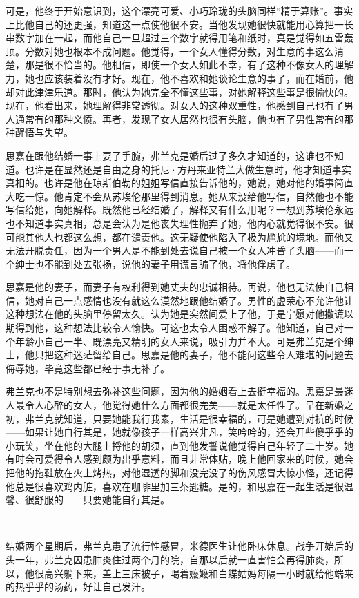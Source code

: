 \par 可是，他终于开始意识到，这个漂亮可爱、小巧玲珑的头脑同样“精于算账”。事实上比他自己的还更强，知道这一点使他很不安。当他发现她很快就能用心算把一长串数字加在一起，而他自己一旦超过三个数字就得用笔和纸时，真是觉得如五雷轰顶。分数对她也根本不成问题。他觉得，一个女人懂得分数，对生意的事这么清楚，那是很不恰当的。他相信，即使一个女人如此不幸，有了这种不像女人的理解力，她也应该装着没有才好。现在，他不喜欢和她谈论生意的事了，而在婚前，他却对此津津乐道。那时，他认为她完全不懂这些事，对她解释这些事是很愉快的。现在，他看出来，她理解得非常透彻。对女人的这种双重性，他感到自己也有了男人通常有的那种义愤。再者，发现了女人居然也很有头脑，他也有了男性常有的那种醒悟与失望。
\par 思嘉在跟他结婚一事上耍了手腕，弗兰克是婚后过了多久才知道的，这谁也不知道。也许是在显然还是自由之身的托尼·方丹来亚特兰大做生意时，他才知道事实真相的。也许是他在琼斯伯勒的姐姐写信直接告诉他的，她说，她对他的婚事简直大吃一惊。他肯定不会从苏埃伦那里得到消息。她从来没给他写信，自然他也不能写信给她，向她解释。既然他已经结婚了，解释又有什么用呢？一想到苏埃伦永远也不知道事实真相，总是会认为是他丧失理性抛弃了她，他内心就觉得很不安。很可能其他人也都这么想，都在谴责他。这无疑使他陷入了极为尴尬的境地。而他又无法开脱责任，因为一个男人是不能到处去说自己被一个女人冲昏了头脑——而一个绅士也不能到处去张扬，说他的妻子用谎言骗了他，将他俘虏了。
\par 思嘉是他的妻子，而妻子有权利得到她丈夫的忠诚相待。再说，他也无法使自己相信，她对自己一点感情也没有就这么漠然地跟他结婚了。男性的虚荣心不允许他让这种想法在他的头脑里停留太久。认为她是突然间爱上了他，于是宁愿对他撒谎以期得到他，这种想法比较令人愉快。可这也太令人困惑不解了。他知道，自己对一个年龄小自己一半、既漂亮又精明的女人来说，吸引力并不大。可是弗兰克是个绅士，他只把这种迷茫留给自己。思嘉是他的妻子，他不能问这些令人难堪的问题去侮辱她，毕竟这些都已经于事无补了。
\par 弗兰克也不是特别想去弥补这些问题，因为他的婚姻看上去挺幸福的。思嘉是最迷人最令人心醉的女人，他觉得她什么方面都很完美——就是太任性了。早在新婚之初，弗兰克就知道，只要她能我行我素，生活是很幸福的，可是她遭到对抗的时候——如果让她自行其是，她就像孩子一样高兴非凡，笑吟吟的，还会开些傻乎乎的小玩笑，坐在他的大腿上捋他的胡须，直到他发誓说他觉得自己年轻了二十岁。她有时会可爱得令人感到颇为出乎意料，而且非常体贴，晚上他回家来的时候，她会把他的拖鞋放在火上烤热，对他湿透的脚和没完没了的伤风感冒大惊小怪，还记得他总是很喜欢鸡内脏，喜欢在咖啡里加三茶匙糖。是的，和思嘉在一起生活是很温馨、很舒服的——只要她能自行其是。
\par  
\par 结婚两个星期后，弗兰克患了流行性感冒，米德医生让他卧床休息。战争开始后的头一年，弗兰克因患肺炎住过两个月的院，自那以后就一直害怕会再得肺炎，所以，他很高兴躺下来，盖上三床被子，喝着嬷嬷和白蝶姑妈每隔一小时就给他端来的热乎乎的汤药，好让自己发汗。
